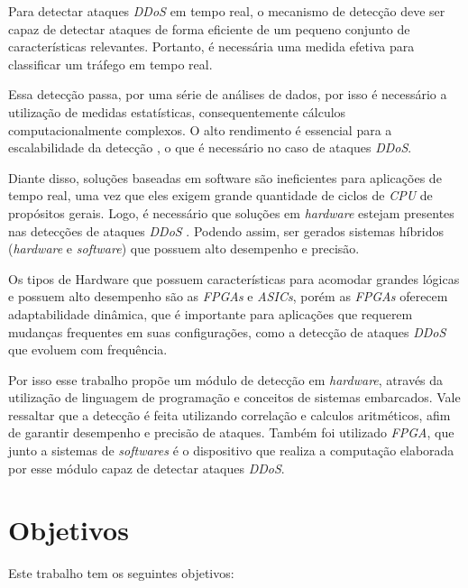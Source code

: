 Para detectar ataques  \textit{DDoS} em tempo real, o mecanismo de detecção deve ser capaz de detectar ataques de forma eficiente de um pequeno conjunto de características relevantes.
Portanto, é necessária uma medida efetiva  para classificar um  tráfego em tempo real. 

Essa detecção passa, por uma série de análises de dados, por isso é necessário a utilização de medidas estatísticas, consequentemente cálculos computacionalmente complexos. O alto rendimento é essencial para a escalabilidade da detecção , o que é necessário no caso de ataques \textit{DDoS}.

Diante disso, soluções baseadas em software são ineficientes para aplicações de tempo real, uma vez que eles exigem grande quantidade de ciclos de \textit{CPU} de propósitos gerais. Logo, é necessário que soluções em \textit{hardware} estejam presentes nas detecções de ataques \textit{DDoS} . Podendo assim, ser gerados sistemas híbridos (\textit{hardware} e \textit{software}) que possuem alto desempenho e precisão.

Os tipos de Hardware que possuem características para acomodar grandes lógicas e possuem alto desempenho são as \textit{FPGAs} e \textit{ASICs}, porém as \textit{FPGAs} oferecem adaptabilidade dinâmica, que é importante para aplicações que requerem mudanças frequentes em suas configurações, como a detecção de ataques \textit{DDoS} que evoluem com frequência. 

Por isso esse trabalho propõe um módulo de detecção em \textit{hardware}, através da utilização de linguagem de programação e conceitos de sistemas embarcados. Vale ressaltar que a detecção é feita utilizando correlação e calculos aritméticos, afim de garantir desempenho e precisão de ataques. Também foi utilizado \textit{FPGA}, que junto a sistemas de  \textit{softwares} é o dispositivo que realiza a computação elaborada por esse módulo capaz de  detectar ataques  \textit{DDoS}.

\section{Objetivos}

   Este trabalho tem os seguintes objetivos:

